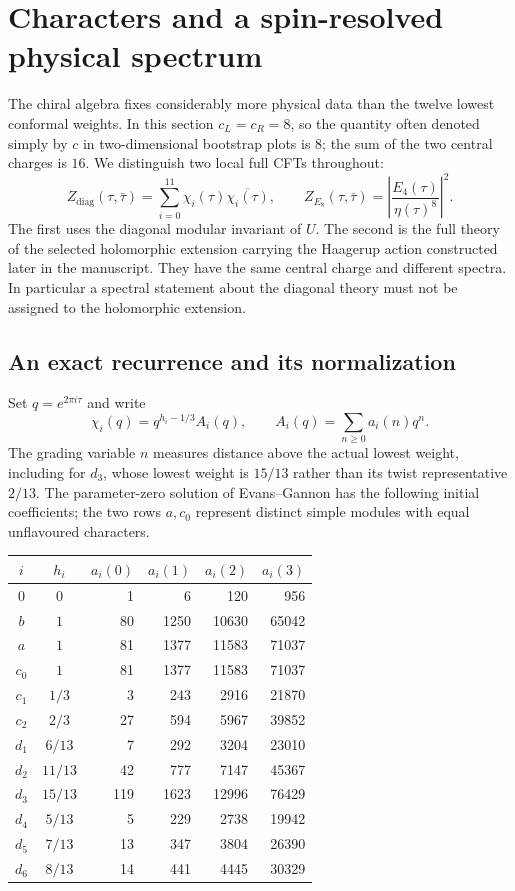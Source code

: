 \documentclass[11pt,a4paper]{article}
\theoremstyle{definition}
\begin{document}
\section{Characters and a spin-resolved physical spectrum}
\label{sec:physics-spectrum}

The chiral algebra fixes considerably more physical data than the twelve
lowest conformal weights.  In this section $c_L=c_R=8$, so the quantity
often denoted simply by $c$ in two-dimensional bootstrap plots is $8$;
the sum of the two central charges is $16$.  We distinguish two local
full CFTs throughout:
\begin{equation}\label{eq:physics-two-partitions}
 Z_{\mathrm{diag}}(\tau,\bar\tau)
   =\sum_{i=0}^{11}\chi_i(\tau)\overline{\chi_i(\tau)},
 \qquad
 Z_{E_8}(\tau,\bar\tau)
   =\left|\frac{E_4(\tau)}{\eta(\tau)^8}\right|^2.
\end{equation}
The first uses the diagonal modular invariant of $U$.  The second is
the full theory of the selected holomorphic extension carrying the
Haagerup action constructed later in the manuscript.  They have the
same central charge and different spectra.  In particular a spectral
statement about the diagonal theory must not be assigned to the
holomorphic extension.

\subsection{An exact recurrence and its normalization}

Set $q=e^{2\pi i\tau}$ and write
\[
 \chi_i(q)=q^{h_i-1/3}A_i(q),\qquad
 A_i(q)=\sum_{n\geq0}a_i(n)q^n.
\]
The grading variable $n$ measures distance above the actual lowest
weight, including for $d_3$, whose lowest weight is $15/13$ rather
than its twist representative $2/13$.  The parameter-zero solution of
Evans--Gannon \cite[Sections~1.4 and~2.4]{EG} has the following initial
coefficients; the two rows $a,c_0$ represent distinct simple modules
with equal unflavoured characters.
\begin{center}
\begin{tabular}{c|c|rrrr}
 $i$&$h_i$&$a_i(0)$&$a_i(1)$&$a_i(2)$&$a_i(3)$\\\hline
 $0$&$0$&1&6&120&956\\
 $b$&$1$&80&1250&10630&65042\\
 $a$&$1$&81&1377&11583&71037\\
 $c_0$&$1$&81&1377&11583&71037\\
 $c_1$&$1/3$&3&243&2916&21870\\
 $c_2$&$2/3$&27&594&5967&39852\\
 $d_1$&$6/13$&7&292&3204&23010\\
 $d_2$&$11/13$&42&777&7147&45367\\
 $d_3$&$15/13$&119&1623&12996&76429\\
 $d_4$&$5/13$&5&229&2738&19942\\
 $d_5$&$7/13$&13&347&3804&26390\\
 $d_6$&$8/13$&14&441&4445&30329
\end{tabular}
\end{center}
\end{document}
